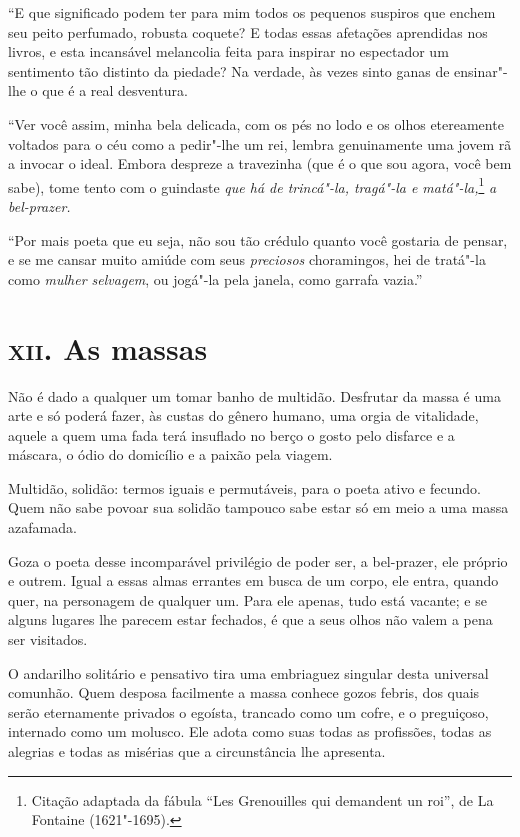 “E que significado podem ter para mim todos os pequenos
suspiros que enchem seu peito perfumado, robusta coquete? E todas essas
afetações aprendidas nos livros, e esta incansável melancolia feita
para inspirar no espectador um sentimento tão distinto da piedade? Na
verdade, às vezes sinto ganas de ensinar"-lhe o que é a real
desventura.

“Ver você assim, minha bela delicada, com os pés no lodo e
os olhos etereamente voltados para o céu como a pedir"-lhe um rei,
lembra genuinamente uma jovem rã a invocar o ideal. Embora
despreze a travezinha (que é o que sou agora, você bem sabe), tome
tento com o guindaste \textit{que há de trincá"-la, tragá"-la e matá"-la,}\footnote{  Citação 
adaptada da fábula ``Les Grenouilles qui demandent un roi'', 
de La Fontaine (1621"-1695).}
\textit{a bel-prazer.}

“Por mais poeta que eu seja, não sou tão crédulo quanto
você gostaria de pensar, e se me cansar muito amiúde com seus \textit{preciosos}
choramingos, hei de tratá"-la como \textit{mulher selvagem}, ou jogá"-la pela
janela, como garrafa vazia.''

\chapter{\textsc{xii.} As massas}

Não é dado a qualquer um tomar banho de multidão. Desfrutar da massa é uma
arte e só poderá fazer, às custas do gênero humano, uma orgia de
vitalidade, aquele a quem uma fada terá insuflado no berço o gosto
pelo disfarce e a máscara, o ódio do domicílio e a paixão pela
viagem.

Multidão, solidão: termos iguais e permutáveis, para o poeta ativo e
fecundo. Quem não sabe povoar sua solidão tampouco sabe estar só em
meio a uma massa azafamada.

Goza o poeta desse incomparável privilégio de poder ser, a bel-prazer,
ele próprio e outrem. Igual a essas almas errantes em busca de um corpo,
ele entra, quando quer, na personagem de qualquer um. Para ele apenas, tudo
está vacante; e se alguns lugares lhe parecem estar fechados, é que a
seus olhos não valem a pena ser visitados.

O andarilho solitário e pensativo tira uma embriaguez singular desta
universal comunhão. Quem desposa facilmente a massa conhece gozos
febris, dos quais serão eternamente privados o egoísta, trancado como
um cofre, e o preguiçoso, internado como um molusco. Ele adota como
suas todas as profissões, todas as alegrias e todas as misérias que a
circunstância lhe apresenta.

